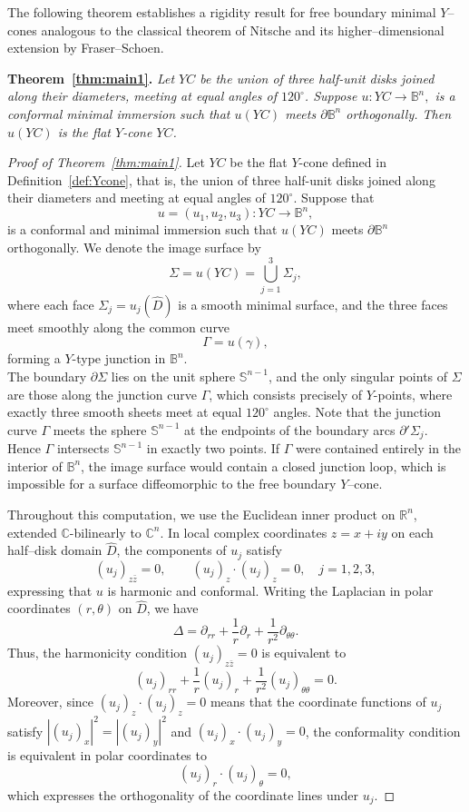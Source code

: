 \documentclass[11pt]{amsart}
\numberwithin{equation}{section}
\theoremstyle{theorem}
\theoremstyle{definition}
\numberwithin{equation}{section}
\begin{document}
The following theorem establishes a rigidity result for free boundary minimal $Y$–cones analogous to the classical theorem of Nitsche and its higher–dimensional extension by Fraser–Schoen.

\noindent
\textbf{Theorem~\ref{thm:main1}.}
\emph{
Let $YC$ be the union of three half-unit disks joined along their diameters, meeting at equal angles of $120^\circ$. 
Suppose $u : YC \to \mathbb{B}^n,$ is a conformal minimal immersion such that $u(YC)$ meets $\partial \mathbb{B}^n$ orthogonally. 
Then $u(YC)$ is the flat $Y$-cone $YC$.
}

\begin{proof}[Proof of Theorem~\ref{thm:main1}]
Let $YC$ be the flat $Y$-cone defined in Definition~\ref{def:Ycone}, 
that is, the union of three half-unit disks joined along their diameters and meeting at equal angles of $120^\circ$. 
Suppose that
\[
u = (u_1, u_2, u_3) : YC \to \mathbb{B}^n,
\]
is a conformal and minimal immersion such that $u(YC)$ meets $\partial \mathbb{B}^n$ orthogonally. 
We denote the image surface by 
\[
\Sigma = u(YC) = \bigcup_{j=1}^{3} \Sigma_j,
\]
where each face $\Sigma_j = u_j(\hat D)$ is a smooth minimal surface, 
and the three faces meet smoothly along the common curve 
\[
\Gamma = u(\gamma),
\]
forming a $Y$-type junction in $\mathbb{B}^n$.\\
The boundary $\partial \Sigma$ lies on the unit sphere $\mathbb{S}^{n-1}$, and the only singular points of $\Sigma$ are those along the junction curve $\Gamma$, which consists precisely of $Y$-points, where exactly three smooth sheets meet at equal $120^\circ$ angles. Note that the junction curve $\Gamma$ meets the sphere $\mathbb{S}^{n-1}$ at the endpoints of the boundary arcs $\partial'\Sigma_j$. 
Hence $\Gamma$ intersects $\mathbb{S}^{n-1}$ in exactly two points. 
If $\Gamma$ were contained entirely in the interior of $\mathbb{B}^n$, the image surface would contain a closed junction loop, which is impossible for a surface diffeomorphic to the free boundary $Y$–cone. 
\medskip

Throughout this computation, we use the Euclidean inner product on $\mathbb{R}^n$,
extended $\mathbb{C}$-bilinearly to $\mathbb{C}^n$. In local complex coordinates $z = x + i y$ on each half–disk domain $\hat{D}$, 
the components of $u_j$ satisfy
\[
(u_j)_{z\bar{z}} = 0, \qquad (u_j)_z \cdot (u_j)_z = 0, \quad j = 1,2,3,
\]
expressing that $u$ is harmonic and conformal. 
Writing the Laplacian in polar coordinates $(r,\theta)$ on $\hat{D}$, we have
\[
\Delta = \partial_{rr} + \frac{1}{r} \partial_r + \frac{1}{r^2}\partial_{\theta\theta}.
\]
Thus, the harmonicity condition $(u_j)_{z\bar{z}} = 0$ is equivalent to
\[
(u_j)_{rr} + \frac{1}{r}(u_j)_r + \frac{1}{r^2}(u_j)_{\theta\theta} = 0.
\]
Moreover, since $(u_j)_z \cdot (u_j)_z = 0$ means that the coordinate functions of $u_j$ satisfy 
$| (u_j)_x |^2 = | (u_j)_y |^2$ and $(u_j)_x \cdot (u_j)_y = 0$, 
the conformality condition is equivalent in polar coordinates to
\[
(u_j)_r \cdot (u_j)_\theta = 0,
\]
which expresses the orthogonality of the coordinate lines under $u_j$.
\medskip



\end{proof}
\end{document}
